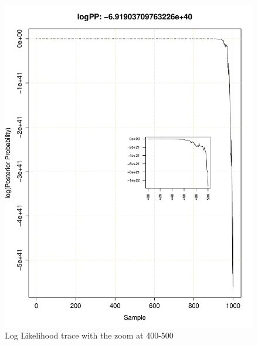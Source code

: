 \documentclass[11pt]{labbook}
\begin{document}
    \begin{figure}
        \centering
        \includegraphics[scale=.75]{FONSE_Plots/2016/June_29/LogLikeTrace_400-500}
        \caption{Log Likelihood trace with the zoom at 400-500}
        \label{fig:JUN29_400-500}
    \end{figure}
\end{document}
